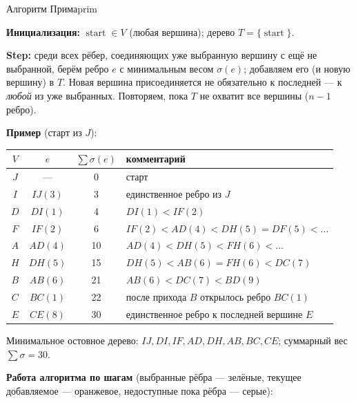 \begin{algo}{Алгоритм Прима}{prim}

\textbf{Инициализация:} $\operatorname{start} \in V$ (любая вершина);
дерево $T = \{\operatorname{start}\}$.

\textbf{Step:} среди всех рёбер, соединяющих уже выбранную вершину с ещё
не выбранной, берём ребро $e$ с минимальным весом $\sigma(e)$; добавляем
его (и новую вершину) в $T$. Новая вершина присоединяется не обязательно
к последней --- к \emph{любой} из уже выбранных. Повторяем, пока $T$ не
охватит все вершины ($n - 1$ ребро).

\medskip
\noindent\textbf{Пример} (старт из $J$):


\medskip
\begin{center}
\begin{tabular}{c|c|c|l}
$V$ & $e$ & $\sum \sigma(e)$ & комментарий \\ \hline
$J$  & ---     & 0  & старт \\
$I$  & $IJ(3)$ & 3  & единственное ребро из $J$ \\
$D$  & $DI(1)$ & 4  & $DI(1) < IF(2)$ \\
$F$  & $IF(2)$ & 6  & $IF(2) < AD(4) < DH(5) = DF(5) < \ldots$ \\
$A$  & $AD(4)$ & 10 & $AD(4) < DH(5) < FH(6) < \ldots$ \\
$H$  & $DH(5)$ & 15 & $DH(5) < AB(6) = FH(6) < DC(7)$ \\
$B$  & $AB(6)$ & 21 & $AB(6) < DC(7) < BD(9)$ \\
$C$  & $BC(1)$ & 22 & после прихода $B$ открылось ребро $BC(1)$ \\
$E$  & $CE(8)$ & 30 & единственное ребро к последней вершине $E$ \\
\end{tabular}
\end{center}

\medskip
Минимальное остовное дерево: $IJ, DI, IF, AD, DH, AB, BC, CE$;
суммарный вес $\sum \sigma = 30$.

\medskip
\noindent\textbf{Работа алгоритма по шагам} (выбранные рёбра --- зелёные,
текущее добавляемое --- оранжевое, недоступные пока рёбра --- серые):


\end{algo}
